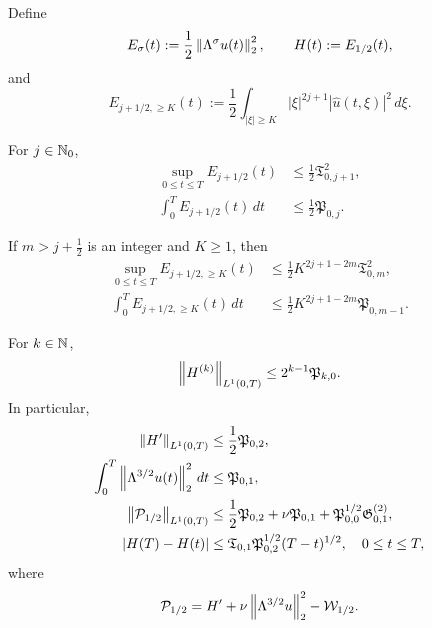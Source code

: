 \begin{proposition}
\label{f:prop:qc-critical-height}
Define
\[
 E_\sigma(t):=\frac12\left\lVert \Lambda^\sigma u(t)\right\rVert_2^2,
 \qquad
 H(t):=E_{1/2}(t),
\]
and
\[
 E_{j+1/2,\ge K}(t)
 :=\frac12\int_{|\xi|\ge K}|\xi|^{2j+1}
 |\widehat u(t,\xi)|^2\,d\xi.
\]
\begin{samepage}
For \(j\in\mathbb N_0\),
\begin{align}
 \sup_{0\le t\le T}E_{j+1/2}(t)
 &\le\frac12\mathfrak T_{0,j+1}^2,
 \label{f:eq:qc-critical-sup}\\
 \int_0^T E_{j+1/2}(t)\,dt
 &\le\frac12\mathfrak P_{0,j}.
 \label{f:eq:qc-critical-mass}
\end{align}
\end{samepage}
If \(m>j+\frac12\) is an integer and \(K\ge1\), then
\begin{align}
 \sup_{0\le t\le T}E_{j+1/2,\ge K}(t)
 &\le\frac12K^{2j+1-2m}\mathfrak T_{0,m}^2,
 \label{f:eq:qc-critical-tail-sup}\\
 \int_0^T E_{j+1/2,\ge K}(t)\,dt
 &\le\frac12K^{2j+1-2m}\mathfrak P_{0,m-1}.
 \label{f:eq:qc-critical-tail-mass}
\end{align}
\begin{samepage}
For \(k\in\mathbb N\),
\begin{equation}
 \left\lVert H^{(k)}\right\rVert_{L^1(0,T)}
 \le2^{k-1}\mathfrak P_{k,0}.
 \label{f:eq:qc-height-derivatives}
\end{equation}
In particular,
\begin{align}
 \left\lVert H'\right\rVert_{L^1(0,T)}
 &\le\frac12\mathfrak P_{0,2},
 \label{f:eq:qc-critical-variation}\\
 \int_0^T\left\lVert \Lambda^{3/2}u(t)\right\rVert_2^2\,dt
 &\le\mathfrak P_{0,1},
 \label{f:eq:qc-critical-dissipation}\\
 \left\lVert \mathcal P_{1/2}\right\rVert_{L^1(0,T)}
 &\le\frac12\mathfrak P_{0,2}+\nu\mathfrak P_{0,1}
 +\mathfrak P_{0,0}^{1/2}\mathfrak G^{(2)}_{0,1},
 \label{f:eq:qc-critical-current}\\
 |H(T)-H(t)|
 &\le
 \mathfrak T_{0,1}\mathfrak P_{0,2}^{1/2}(T-t)^{1/2},
 \quad0\le t\le T,
 \label{f:eq:qc-critical-endpoint-modulus}
\end{align}
where
\[
 \mathcal P_{1/2}
 =H'+\nu\left\lVert \Lambda^{3/2}u\right\rVert_2^2-\mathcal W_{1/2}.
\]
\par
\end{samepage}
\end{proposition}

